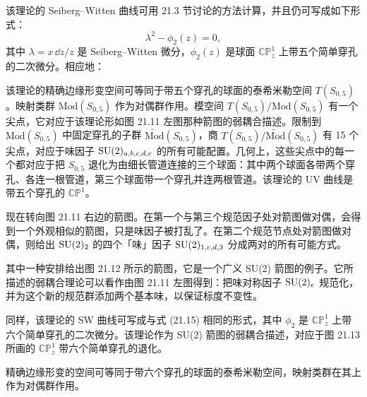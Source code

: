 该理论的 Seiberg–Witten 曲线可用 21.3 节讨论的方法计算，并且仍可写成如下形式：
\begin{equation}
\lambda^2-\phi_2(z)=0, \tag{21.15}
\end{equation}
其中 $\lambda=x\,\dd z/z$ 是 Seiberg–Witten 微分，$\phi_2(z)$ 是球面 $\mathbb{CP}^1_z$ 上带五个简单穿孔的二次微分。相应地：

\begin{proposition}[21.25] 该理论的精确边缘形变空间可等同于带五个穿孔的球面的泰希米勒空间 $T(S_{0,5})$。映射类群 $\mathrm{Mod}(S_{0,5})$ 作为对偶群作用。模空间 $T(S_{0,5})/\mathrm{Mod}(S_{0,5})$ 有一个尖点，它对应于该理论形如图 21.11 左图那种箭图的弱耦合描述。限制到 $\mathrm{Mod}(S_{0,5})$ 中固定穿孔的子群 $\widetilde{\mathrm{Mod}}(S_{0,5})$，商 $T(S_{0,5})/\widetilde{\mathrm{Mod}}(S_{0,5})$ 有 15 个尖点，对应于味因子 $\operatorname{SU}(2)_{a,b,c,d,e}$ 的所有可能配置。几何上，这些尖点中的每一个都对应于把 $S_{0,5}$ 退化为由细长管道连接的三个球面：其中两个球面各带两个穿孔、各连一根管道，第三个球面带一个穿孔并连两根管道。该理论的 UV 曲线是带五个穿孔的 $\mathbb{CP}^1$。
\end{proposition}

现在转向图 21.11 右边的箭图。在第一个与第三个规范因子处对箭图做对偶，会得到一个外观相似的箭图，只是味因子被打乱了。在第二个规范节点处对箭图做对偶，则给出 $\operatorname{SU}(2)_2$ 的四个「味」因子 $\operatorname{SU}(2)_{1,c,d,3}$ 分成两对的所有可能方式。

其中一种安排给出图 21.12 所示的箭图，它是一个广义 SU(2) 箭图的例子。它所描述的弱耦合理论可以看作由图 21.11 左图得到：把味对称因子 $\operatorname{SU}(2)_e$ 规范化，并为这个新的规范群添加两个基本味，以保证标度不变性。

同样，该理论的 SW 曲线可写成与式 (21.15) 相同的形式，其中 $\phi_2$ 是 $\mathbb{CP}^1_z$ 上带六个简单穿孔的二次微分。该理论作为 SU(2) 箭图的弱耦合描述，对应于图 21.13 所画的 $\mathbb{CP}^1_z$ 带六个简单穿孔的退化。

精确边缘形变的空间可等同于带六个穿孔的球面的泰希米勒空间，映射类群在其上作为对偶群作用。

